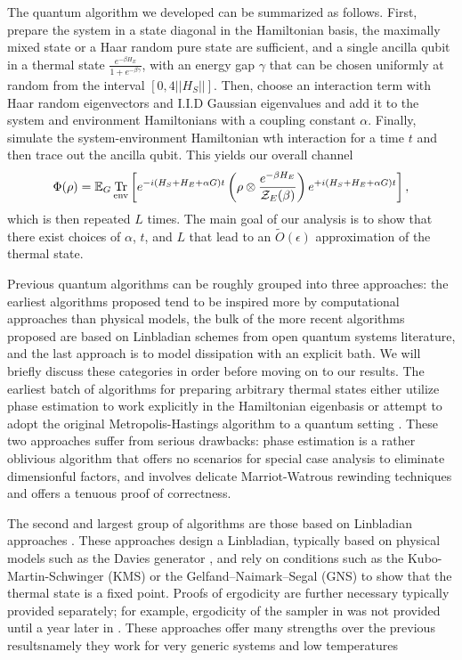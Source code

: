 \documentclass[11pt]{article}
\newcommand{\brackets}[1]{\left[ #1 \right]}
\newcommand{\norm}[1]{\left|\left| #1 \right|\right|}
\newcommand{\bigotilde}[1]{\widetilde{O} \left( #1 \right)}
\DeclareMathOperator{\Tr}{Tr}
\newcommand{\partrace}[2]{\Tr_{#1} \brackets{ #2 }}
\newcommand{\partfun}{\mathcal{Z}}
\begin{document}
The quantum algorithm we developed can be summarized as follows. First, prepare the system in a state diagonal in the Hamiltonian basis, the maximally mixed state or a Haar random pure state are sufficient, and a single ancilla qubit in a thermal state $\frac{e^{-\beta H_E}}{1 + e^{-\beta \gamma}}$, with an energy gap $\gamma$ that can be chosen uniformly at random from the interval $[0, 4\norm{H_S}]$. Then, choose an interaction term with Haar random eigenvectors and I.I.D Gaussian eigenvalues and add it to the system and environment Hamiltonians with a coupling constant $\alpha$. Finally, simulate the system-environment Hamiltonian wth interaction for a time $t$ and then trace out the ancilla qubit. This yields our overall channel
\begin{equation}
    \Phi(\rho) = \mathbb{E}_G \partrace{\rm env}{e^{-i(H_S + H_E + \alpha G) t} \left( \rho \otimes \frac{e^{-\beta H_E}}{\partfun_E(\beta)} \right) e^{+i(H_S + H_E + \alpha G) t} },
\end{equation}
which is then repeated $L$ times. The main goal of our analysis is to show that there exist choices of $\alpha$, $t$, and $L$ that lead to an $\bigotilde{\epsilon}$ approximation of the thermal state.

Previous quantum algorithms can be roughly grouped into three approaches: the earliest algorithms proposed tend to be inspired more by computational approaches than physical models, the bulk of the more recent algorithms proposed are based on Linbladian schemes from open quantum systems literature, and the last approach is to model dissipation with an explicit bath. We will briefly discuss these categories in order before moving on to our results. The earliest batch of algorithms for preparing arbitrary thermal states either utilize phase estimation to work explicitly in the Hamiltonian eigenbasis \cite{poulin2009sampling} or attempt to adopt the original Metropolis-Hastings algorithm to a quantum setting \cite{temme2011}. These two approaches suffer from serious drawbacks: phase estimation is a rather oblivious algorithm that offers no scenarios for special case analysis to eliminate dimensionful factors, and \cite{temme2011} involves delicate Marriot-Watrous rewinding techniques \cite{marriott2005quantum} and offers a tenuous proof of correctness.

The second and largest group of algorithms are those based on Linbladian approaches \cite{chen2023quantumthermalstatepreparation, gilyen2024quantumgeneralizationsglaubermetropolis, ding2024efficientquantumgibbssamplers, ding2024single}. These approaches design a Linbladian, typically based on physical models such as the Davies generator \cite{davies1974markovian}, and rely on conditions such as the Kubo-Martin-Schwinger (KMS) or the Gelfand–Naimark–Segal (GNS) \cite{alicki1976detailed} to show that the thermal state is a fixed point. Proofs of ergodicity are further necessary typically provided separately; for example, ergodicity of the sampler in \cite{chen2023quantumthermalstatepreparation} was not provided until a year later in \cite{gilyen2024quantumgeneralizationsglaubermetropolis}. These approaches offer many strengths over the previous resultsnamely they work for very generic systems and low temperatures 
 
\end{document}
